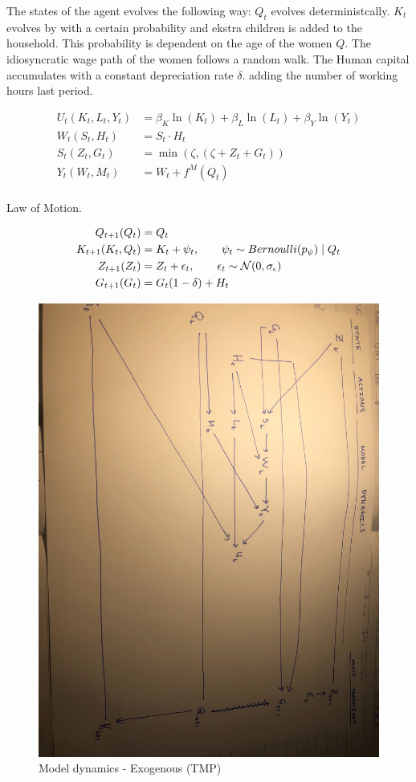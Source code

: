 The states of the agent evolves the following way: $Q_t$ evolves deterministcally. $K_t$ evolves by with a certain probability and ekstra children is added to the household. This probability is dependent on the age of the women $Q$. The idiosyncratic wage path of the women follows a random walk. The Human capital accumulates with a constant depreciation rate $\delta$. adding the number of working hours last period.

\begin{align}
    U_t(K_t, L_t, Y_t) &= \beta_K \ln(K_t) + \beta_L \ln(L_t) + \beta_Y \ln(Y_t) \\
    W_t(S_t, H_t) &=S_t \cdot H_t \\
    S_t(Z_t, G_t) &= \min(\zeta, (\zeta + Z_t + G_t))  \\
    Y_t(W_t, M_t) &= W_t + f^M(Q_t)\\
\end{align}


Law of Motion.

\begin{align}
    Q_{t+1}(Q_t) &= Q_t \\
    K_{t+1}(K_t, Q_t)  &= K_{t} + \psi_t, \qquad \psi_t \sim Bernoulli(p_\psi) \mid Q_t \\
    Z_{t+1}(Z_t) &= Z_t + \epsilon_t, \qquad \epsilon_t \sim \mathcal{N}(0, \sigma_\epsilon) \\
    G_{t+1}(G_t) &= G_t(1 - \delta) + H_t \\
\end{align}


\begin{figure}
    \centering
    \includegraphics[scale=0.1, angle=90]{figures/modeldynamic_tmp_exogenous.jpg}
    \caption{Model dynamics - Exogenous (TMP)}
    \label{fig:tmp_modeldynamics_exogenous}
\end{figure}